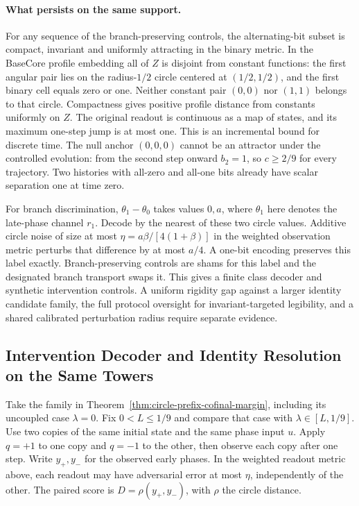 \documentclass[11pt,a4paper]{article}
\theoremstyle{definition}
\begin{document}
\paragraph{What persists on the same support.}
For any sequence of the branch-preserving controls, the alternating-bit subset is compact, invariant and uniformly attracting in the binary metric. In the BaseCore profile embedding all of $Z$ is disjoint from constant functions: the first angular pair lies on the radius-$1/2$ circle centered at $(1/2,1/2)$, and the first binary cell equals zero or one. Neither constant pair $(0,0)$ nor $(1,1)$ belongs to that circle. Compactness gives positive profile distance from constants uniformly on $Z$. The original readout is continuous as a map of states, and its maximum one-step jump is at most one. This is an incremental bound for discrete time. The null anchor $(0,0,0)$ cannot be an attractor under the controlled evolution: from the second step onward $b_2=1$, so $c\ge2/9$ for every trajectory. Two histories with all-zero and all-one bits already have scalar separation one at time zero.

For branch discrimination, $\theta_1-\theta_0$ takes values $0,a$, where $\theta_1$ here denotes the late-phase channel $r_1$. Decode by the nearest of these two circle values. Additive circle noise of size at most $\eta=a\beta/[4(1+\beta)]$ in the weighted observation metric perturbs that difference by at most $a/4$. A one-bit encoding preserves this label exactly. Branch-preserving controls are shams for this label and the designated branch transport swaps it. This gives a finite class decoder and synthetic intervention controls. A uniform rigidity gap against a larger identity candidate family, the full protocol oversight for invariant-targeted legibility, and a shared calibrated perturbation radius require separate evidence.

\subsection{Intervention Decoder and Identity Resolution on the Same Towers}

Take the family in Theorem~\ref{thm:circle-prefix-cofinal-margin}, including its uncoupled case $\lambda=0$. Fix $0<L\leq1/9$ and compare that case with $\lambda\in[L,1/9]$. Use two copies of the same initial state and the same phase input $u$. Apply $q=+1$ to one copy and $q=-1$ to the other, then observe each copy after one step. Write $y_+,y_-$ for the observed early phases. In the weighted readout metric above, each readout may have adversarial error at most $\eta$, independently of the other. The paired score is $D=\rho(y_+,y_-)$, with $\rho$ the circle distance.
\end{document}
